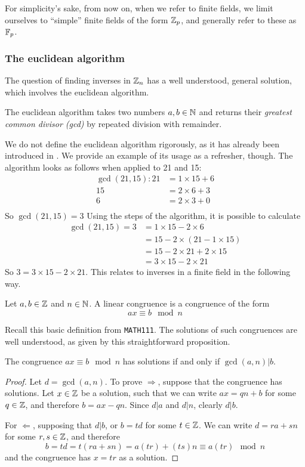 For simplicity's sake, from now on, when we refer to finite fields, we limit ourselves to ``simple'' finite fields of the form $\zn[p]$, and generally refer to these as $\fp$.

\subsubsection{The euclidean algorithm}
The question of finding inverses in $\zn$ has a well understood, general solution, which involves the euclidean algorithm.
\begin{definition}
	The euclidean algorithm takes two numbers $a,b \in \N$ and returns their \emph{greatest common divisor (gcd)} by repeated division with remainder.
\end{definition}
We do not define the euclidean algorithm rigorously, as it has already been introduced in \cite{111-lectures}.
We provide an example of its usage as a refresher, though.
The algorithm looks as follows when applied to 21 and 15:
\begin{align*}
	\gcd(21,15):21 &= 1\times15 + 6\\
	15 &= 2\times6 + 3\\
	6 &= 2\times3 + 0\\
\end{align*}
So $\gcd(21,15)=3$
Using the steps of the algorithm, it is possible to calculate
\begin{align*}
	\gcd(21,15) = 3 &= 1\times15 - 2\times6\\
	&= 15 - 2\times(21 - 1\times15)\\
	&= 15 - 2\times21 + 2\times15\\
	&=3\times15 - 2\times21
\end{align*}
So $3 = 3\times15 - 2\times21$.
This relates to inverses in a finite field in the following way.
\begin{definition}
	Let $a,b \in \Z$ and $n \in \N$.
	A linear congruence is a congruence of the form
	$$ax \equiv b \mod n$$
\end{definition}
Recall this basic definition from \texttt{MATH111}.
The solutions of such congruences are well understood, as given by this straightforward proposition.
\begin{proposition}
	The congruence $ax \equiv b \mod n$ has solutions if and only if $\gcd(a,n)|b$.\label{congruencesolutions}
\end{proposition}
\begin{proof}
	Let $d = \gcd(a,n)$.
	To prove $\Rightarrow$, suppose that the congruence has solutions.
	Let $x \in \Z$ be a solution, such that we can write $ax = qn + b$ for some $q \in \Z$, and therefore $b = ax - qn$.
	Since $d|a$ and $d|n$, clearly $d|b$.

	For  $\Leftarrow$, supposing that $d|b$, or $b=td$ for some $t \in \Z$.
	We can write $d = ra + sn$ for some $r,s \in \Z$, and therefore
	$$b = td = t(ra + sn) = a(tr) + (ts)n \equiv a(tr) \mod n$$
	and the congruence has $x = tr$ as a solution.
\end{proof}
